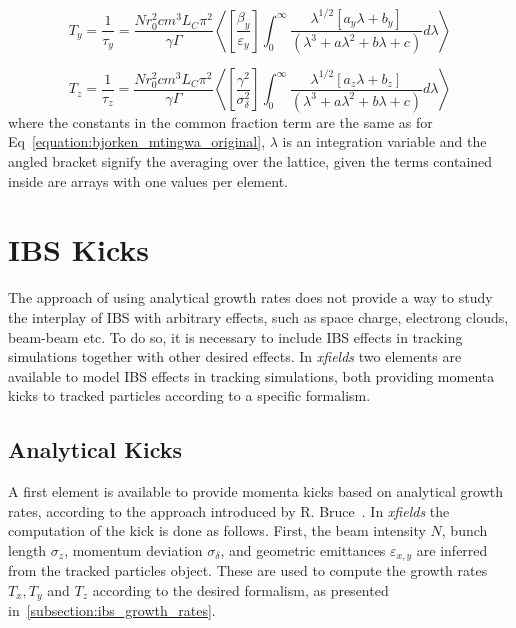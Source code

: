 \begin{equation}
    \boxed{T_y = \frac{1}{\tau_y} = \frac{N r_0^{2} c m^3 L_C \pi^2}{\gamma \Gamma} \left< \left[\frac{\beta_y}{\varepsilon_y}\right] \int_0^{\infty} \frac{\lambda^{1/2} \left[a_y \lambda + b_y\right]}{\left(\lambda^3 + a \lambda^2 + b \lambda + c\right)} d \lambda \right>}
    \label{equation:bm_ty}
\end{equation}

\begin{equation}
    \boxed{T_z = \frac{1}{\tau_z} = \frac{N r_0^{2} c m^3 L_C \pi^2}{\gamma \Gamma} \left< \left[\frac{\gamma^2}{\sigma_{\delta}^{2}}\right] \int_0^{\infty} \frac{\lambda^{1/2} \left[a_z \lambda + b_z\right]}{\left(\lambda^3 + a \lambda^2 + b \lambda + c\right)} d \lambda \right>}
    \label{equation:bm_tz}
\end{equation}
where the constants in the common fraction term are the same as for Eq~\eqref{equation:bjorken_mtingwa_original}, \(\lambda\) is an integration variable and the angled bracket signify the averaging over the lattice, given the terms contained inside are arrays with one values per element.

\section{IBS Kicks}
\label{subsection:ibs_kicks}

The approach of using analytical growth rates does not provide a way to study the interplay of IBS with arbitrary effects, such as space charge, electrong clouds, beam-beam etc.
To do so, it is necessary to include IBS effects in tracking simulations together with other desired effects.
In \textit{xfields} two elements are available to model IBS effects in tracking simulations, both providing momenta kicks to tracked particles according to a specific formalism.

\subsection{Analytical Kicks}

A first element is available to provide momenta kicks based on analytical growth rates, according to the approach introduced by R. Bruce~\cite{PRAB:Bruce:IBSAnalyticalKick}.
In \textit{xfields} the computation of the kick is done as follows.
First, the beam intensity \(N\), bunch length \(\sigma_z\), momentum deviation \(\sigma_{\delta}\), and geometric emittances \(\varepsilon_{x,y}\) are inferred from the tracked particles object.
These are used to compute the growth rates \(T_x, T_y\) and \(T_z\) according to the desired formalism, as presented in~\ref{subsection:ibs_growth_rates}.

